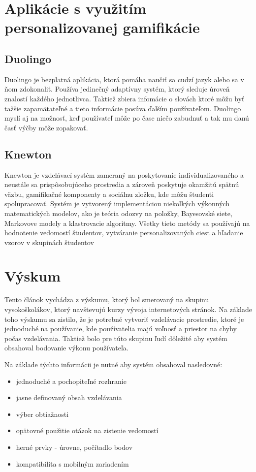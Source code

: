 \documentclass[10pt,twoside,slovak,a4paper]{article}
\begin{document}
\section{Aplikácie s využitím personalizovanej gamifikácie} \label{aplikacie}

\subsection{Duolingo} \label{aplikacie:duolingo}

Duolingo je bezplatná aplikácia, ktorá pomáha naučiť sa cudzí jazyk alebo sa v ňom zdokonaliť. Používa jedinečný adaptívny systém, ktorý sleduje úroveň znalostí každého jednotlivca. Taktiež zbiera infomácie o slovách ktoré môžu byť tažšie zapamätateľné a tieto informácie posúva ďalším používateľom. Duolingo myslí aj na možnosť, keď používateľ môže po čase niečo zabudnuť a tak mu danú časť výčby môže zopakovať. \cite{duolingo}

\subsection{Knewton} \label{aplikacie:knewton}

Knewton je vzdelávací systém zameraný na poskytovanie individualizovaného a neustále sa prispôsobujúceho prostredia a zároveň poskytuje okamžitú spätnú väzbu, gamifikačné komponenty a sociálnu zložku, kde môžu študenti spolupracovať. Systém je vytvorený implementáciou niekoľkých výkonných matematických modelov, ako je teória odozvy na položky, Bayesovské siete, Markovove modely a klastrovacie algoritmy. Všetky tieto metódy sa používajú na hodnotenie vedomostí študentov, vytváranie personalizovaných ciest a hľadanie vzorov v skupinách študentov

\section{Výskum}

Tento článok vychádza z výskumu\cite{adaptiveGamification}, ktorý bol smerovaný na skupinu vysokoškolákov, ktorý navštevujú kurzy vývoja internetových stránok. Na základe toho výskumu sa zistilo, že je potrebné vytvoriť vzdelávacie prostredie, ktoré je jednoduché na používanie, kde používatelia majú voľnosť a priestor na chyby počas vzdelávania. Taktiež bolo pre túto skupinu ľudí dôležité aby systém obsahoval bodovanie výkonu používateľa.

Na základe týchto informácii je nutné aby systém obsahoval nasledovné: 
 \begin{itemize}
\item jednoduché a pochopiteľné rozhranie
\item jasne definovaný obsah vzdelávania
\item výber obtiažnosti
\item opätovné použitie otázok na zistenie vedomostí
\item herné prvky - úrovne, počítadlo bodov \cite{duolingo}
\item kompatibilita s mobilným zariadením
\end{itemize}
\end{document}
